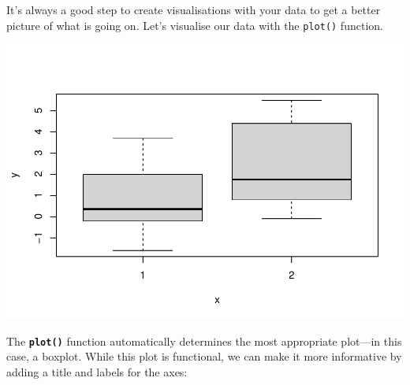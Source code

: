 \documentclass[
]{book}
\newenvironment{Shaded}{\begin{snugshade}}{\end{snugshade}}
\newcommand{\AttributeTok}[1]{\textcolor[rgb]{0.13,0.29,0.53}{#1}}
\newcommand{\CommentTok}[1]{\textcolor[rgb]{0.56,0.35,0.01}{\textit{#1}}}
\newcommand{\FunctionTok}[1]{\textcolor[rgb]{0.13,0.29,0.53}{\textbf{#1}}}
\newcommand{\NormalTok}[1]{#1}
\newcommand{\SpecialCharTok}[1]{\textcolor[rgb]{0.81,0.36,0.00}{\textbf{#1}}}
\newcommand{\StringTok}[1]{\textcolor[rgb]{0.31,0.60,0.02}{#1}}
\begin{document}
It's always a good step to create visualisations with your data to get a better picture of what is going on. Let's visualise our data with the \texttt{plot()} function.

\begin{Shaded}
\end{Shaded}

\includegraphics{rintro_demo_files/figure-latex/unnamed-chunk-24-1.pdf}

The \textbf{\texttt{plot()}} function automatically determines the most appropriate plot---in this case, a boxplot. While this plot is functional, we can make it more informative by adding a title and labels for the axes:

\begin{Shaded}
\end{Shaded}
\end{document}
